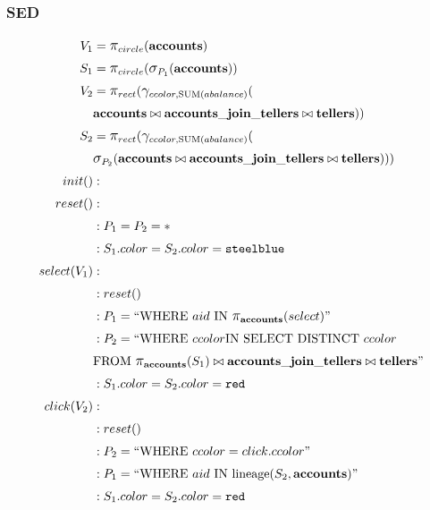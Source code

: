\subsubsection{SED}
\begin{align*}
	V_1&= \mathlarger{\pi}_{circle}(\bf{accounts})\\
	S_1&= \mathlarger{\pi}_{circle}(\mathlarger{\sigma}_{P_1}(\bf{accounts}))\\
	V_2&= \mathlarger{\pi}_{rect}(\mathlarger{\gamma}_{ccolor, \text{SUM}(abalance)}(\\&\bf{accounts}\bowtie{}\bf{accounts\_join\_tellers}\bowtie{}\bf{tellers}))\\
	S_2&= \mathlarger{\pi}_{rect}(\mathlarger{\gamma}_{ccolor, \text{SUM}(abalance)}(\\&\mathlarger{\sigma}_{P_2}(\bf{accounts}\bowtie{}\bf{accounts\_join\_tellers}\bowtie{}\bf{tellers})))\\
	init()&:\\
	reset()&:\\
	&: P_1 = P_2 = *\\
	&: S_1.color = S_2.color = \texttt{steelblue}\\
	select(V_1)&:\\
	&: reset()\\
	&: P_1 = ``\text{WHERE}~aid~\text{IN}~\mathlarger{\pi}_{\bf{accounts}}(select)"\\
	&: P_2 = ``\text{WHERE}~ccolor\text{IN~SELECT~DISTINCT}~ccolor~\\&\text{FROM}~\mathlarger{\pi}_{\bf{accounts}}(S_1)\bowtie{}\bf{accounts\_join\_tellers}\bowtie{}\bf{tellers}"\\
	&: S_1.color = S_2.color = \texttt{red}\\
	click(V_2)&:\\
	&: reset()\\
	&: P_2 = ``\text{WHERE}~ccolor=click.ccolor"\\
	&: P_1 = ``\text{WHERE}~aid~\text{IN~lineage}(S_2, \bf{accounts})"\\
	&: S_1.color = S_2.color = \texttt{red}\\
\end{align*}
